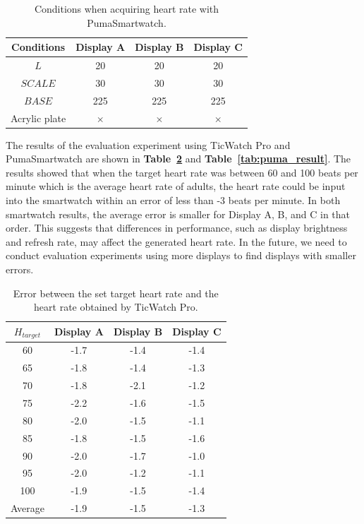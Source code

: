 \documentclass[sigchi,authordraft]{acmart}
\newcommand\tabref[1]{\textbf{Table~\ref{tab:#1}}}
\begin{document}
\begin{table}[!t]
  \centering
  \caption{Conditions when acquiring heart rate with PumaSmartwatch.}
  \begin{tabular}{c|c|c|c} \hline\hline
    Conditions & Display A & Display B & Display C \\ \hline
    $L$ & 20 & 20 & 20 \\
    $SCALE$ & 30 & 30 & 30 \\
    $BASE$ & 225 & 225 & 225 \\
    Acrylic plate & $\times$ & $\times$ & $\times$ \\ \hline
  \end{tabular}
  \label{tab:puma_params}
\end{table}

The results of the evaluation experiment using TicWatch Pro and PumaSmartwatch are shown in \tabref{ticwatch_result} and \tabref{puma_result}. The results showed that when the target heart rate was between 60 and 100 beats per minute which is the average heart rate of adults, the heart rate could be input into the smartwatch within an error of less than -3 beats per minute. In both smartwatch results, the average error is smaller for Display A, B, and C in that order. This suggests that differences in performance, such as display brightness and refresh rate, may affect the generated heart rate. In the future, we need to conduct evaluation experiments using more displays to find displays with smaller errors.

\begin{table}[!t]
  \centering
  \caption{Error between the set target heart rate and the heart rate obtained by TicWatch Pro.}
  \begin{tabular}{c|c|c|c} \hline\hline
    $H_{target}$ & Display A & Display B & Display C \\ \hline
    60 & -1.7 & -1.4 & -1.4 \\
    65 & -1.8 & -1.4 & -1.3 \\
    70 & -1.8 & -2.1 & -1.2 \\
    75 & -2.2 & -1.6 & -1.5 \\
    80 & -2.0 & -1.5 & -1.1 \\
    85 & -1.8 & -1.5 & -1.6 \\
    90 & -2.0 & -1.7 & -1.0 \\
    95 & -2.0 & -1.2 & -1.1 \\
    100 & -1.9 & -1.5 & -1.4 \\ \hline
    Average & -1.9 & -1.5 & -1.3 \\ \hline
  \end{tabular}
  \label{tab:ticwatch_result}
\end{table}
\end{document}
